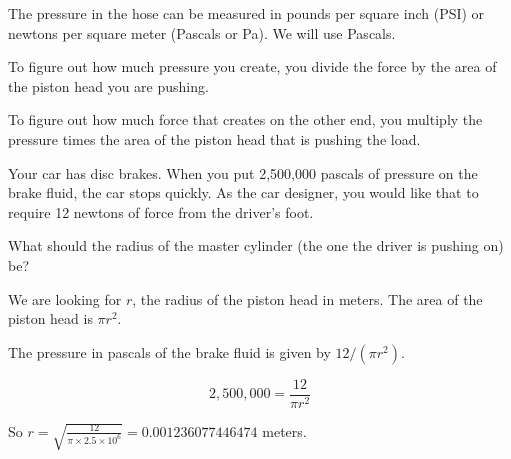 The pressure in the hose can be measured in pounds per square inch
(PSI) or newtons per square meter (Pascals or Pa). We will use Pascals.

To figure out how much pressure you create, you divide the force by
the area of the piston head you are pushing.

To figure out how much force that creates on the other end, you
multiply the pressure times the area of the piston head that is
pushing the load.

\begin{Exercise}[title={Hydraulics}, label=hydraulics]

Your car has disc brakes. When you put 2,500,000 pascals of pressure on the
brake fluid, the car stops quickly. As the car designer, you would like
that to require 12 newtons of force from the driver's foot.

What should the radius of the master cylinder (the one the driver is pushing on) be?
\end{Exercise}
\begin{Answer}[ref=hydraulics]
  We are looking for $r$, the radius of the piston head in meters. The area of the piston head is $\pi r^2$.

  The pressure in pascals of the brake fluid is given by $12 / (\pi r^2)$.

  $$2,500,000 = \frac{12}{\pi r^2}$$

  So $r = \sqrt{\frac{12}{\pi \times 2.5 \times 10^6}} = 0.001236077446474$ meters.

\end{Answer}


